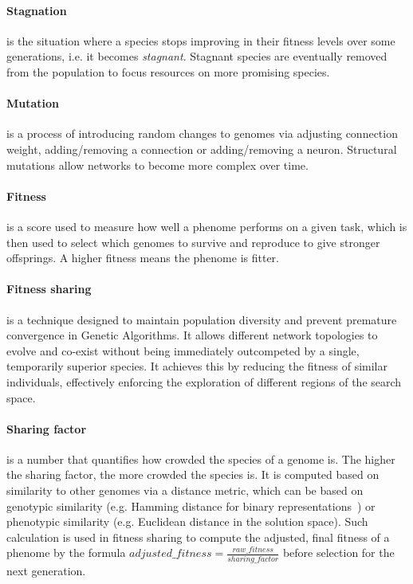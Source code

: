 \paragraph{Stagnation} is the situation where a species stops improving in their fitness levels over some generations, i.e. it becomes \textit{stagnant}. Stagnant species are eventually removed from the population to focus resources on more promising species. 

\paragraph{Mutation} is a process of introducing random changes to genomes via adjusting connection weight, adding/removing a connection or adding/removing a neuron. Structural mutations allow networks to become more complex over time. 

\paragraph{Fitness} is a score used to measure how well a phenome performs on a given task, which is then used to select which genomes to survive and reproduce to give stronger offsprings. A higher fitness means the phenome is fitter. 

\paragraph{Fitness sharing} is a technique designed to maintain population diversity and prevent premature convergence in Genetic Algorithms. It allows different network topologies to evolve and co-exist without being immediately outcompeted by a single, temporarily superior species. It achieves this by reducing the fitness of similar individuals, effectively enforcing the exploration of different regions of the search space. 

\paragraph{Sharing factor} is a number that quantifies how crowded the species of a genome is. The higher the sharing factor, the more crowded the species is. It is computed based on similarity to other genomes via a distance metric, which can be based on genotypic similarity (e.g. Hamming distance for binary representations~\cite{hamming1950error}) or phenotypic similarity (e.g. Euclidean distance in the solution space). Such calculation is used in fitness sharing to compute the adjusted, final fitness of a phenome by the formula $adjusted\_fitness = \frac{raw\_fitness}{sharing\_factor}$ before selection for the next generation. 

